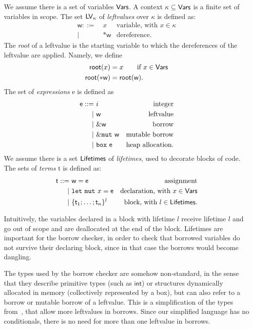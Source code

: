 \begin{definition}
  We assume there is a set of variables $\mathsf{Vars}$.
  A context $\kappa\subseteq\mathsf{Vars}$ is a finite set of variables in scope.
  The set $\mathsf{LV}_\kappa$ of \emph{leftvalues} over $\kappa$ is defined as:
  \begin{align*}
    \mathsf{w} ::= &\ x & \text{variable, with $x\in\kappa$}\\
    | &\ \mathtt{*}\mathsf{w} & \text{dereference.}
  \end{align*}
  The \emph{root} of a leftvalue is the starting variable to which the dereferences of the
  leftvalue are applied. Namely, we define
  \begin{align*}
    \mathsf{root}(x) &= x\qquad\text{if $x\in\mathsf{Vars}$}\\
    \mathsf{root}(\mathtt{*}\mathsf{w}) &= \mathsf{root}(\mathsf{w}).
  \end{align*}
  The set of \emph{expressions} \textsf{e} is defined as
  \begin{align*}
    \mathsf{e} ::= &\ i & \text{integer}\\
    | &\ \mathsf{w} & \text{leftvalue}\\
    | &\ \&\mathsf{w} & \text{borrow}\\
    | &\ \&\mathtt{mut}\ \mathsf{w} & \text{mutable borrow}\\
    | &\ \mathtt{box}\ \mathsf{e} & \text{heap allocation.}
  \end{align*}
  We assume there is a set $\mathsf{Lifetimes}$ of \emph{lifetimes}, used
  to decorate blocks of code.
  The sets of \emph{terms} \textsf{t} is defined as:
  \begin{align*}
    \mathsf{t} ::= &\ \mathsf{w}=\mathsf{e} & \text{assignment}\\
    | &\ \mathtt{let\ mut}\ x=\mathsf{e} & \text{declaration, with $x\in\mathsf{Vars}$}\\
    | &\ \{\mathsf{t}_1;\ldots;\mathsf{t}_n\}^l & \text{block, with $l\in\mathsf{Lifetimes}$.}
  \end{align*}
\end{definition}
%
Intuitively, the variables declared in a block with lifetime $l$ receive lifetime $l$
and go out of scope and are deallocated
at the end of the block. Lifetimes are important for the borrow checker,
in order to check that borrowed variables do not survive their declaring block, since in that
case the borrows would become dangling.

The types used by the borrow checker are somehow non-standard, in the sense
that they describe primitive types (such as $\mathsf{int}$) or structures
dynamically allocated in memory (collectively represented by a box), but can also refer to
a borrow or mutable borrow of a leftvalue.
This is a simplification of the types from~\cite{Pea21}, that allow more leftvalues
in borrows. Since our simplified language has no conditionals, there is no need for
more than one leftvalue in borrows.

